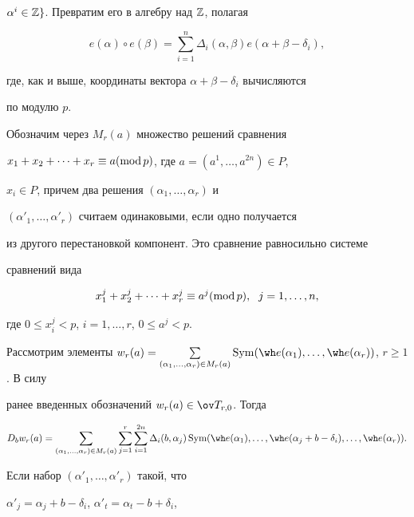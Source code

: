 $\alpha^i\in\Bbb Z\}$. Превратим его в алгебру над $\Bbb Z$, полагая 


$$ 


e(\alpha)\circ e(\beta)=\sum^n_{i=1} 


\Delta_i(\alpha,\beta)e(\alpha+\beta-\delta_i), 


$$ 


где, как и выше, координаты вектора $\alpha+\beta-\delta_i$ вычисляются 


по модулю $p$. 


 


Обозначим через $M_r(a)$ множество решений сравнения 


$x_1+x_2+\dotsb+x_r\equiv a(\operatorname{mod} p)$, где $a=(a^1,\dotsc,a^{2n})\in P$, 


$x_i\in P$, причем два решения $(\alpha_1,\dotsc,\alpha_r)$ и 


$(\alpha'_1,\dotsc,\alpha'_r)$ считаем одинаковыми, если одно получается 


из другого перестановкой компонент. Это сравнение равносильно системе 


сравнений вида 


$$ 


x^j_1+x^j_2+\dotsb+x^j_r\equiv a^j (\Mod p), 


\ \; j=1,\dotsc,n, 


$$ 


где $0\le x^j_i<p$, $i=1,\dotsc,r$, $0\le a^j<p$. 


 


Рассмотрим элементы $w_r(a)=\sum\limits_{(\alpha_1,\dotsc,\alpha_r)\in 


M_r(a)}\Sym(\wh e(\alpha_1),\dotsc,\wh e(\alpha_r))$, $r\ge1$. В силу 


ранее введенных обозначений $w_r(a)\in\ov T_{r,0}$. Тогда 


$$ 


D_b w_r(a)=\sum_{(\alpha_1,\dotsc,\alpha_r)\in M_r(a)} 


\sum^r_{j=1}\sum^{2n}_{i=1}\Delta_i(b,\alpha_j) 


\Sym(\wh e(\alpha_1),\dotsc,\wh e(\alpha_j+b-\delta_i),\dotsc, 


\wh e(\alpha_r)). 


$$ 


Если набор $(\alpha'_1,\dotsc,\alpha'_r)$ такой, что 


$\alpha'_j=\alpha_j+b-\delta_i$, $\alpha'_t=\alpha_t-b+\delta_i$, 


